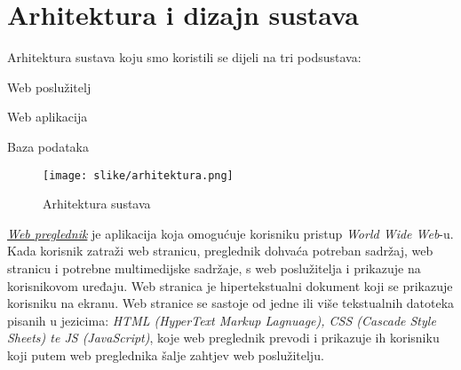 \chapter{Arhitektura i dizajn sustava}
		
%

	Arhitektura sustava koju smo koristili se dijeli na tri podsustava:
	
		\begin{packed_item}
			\item Web poslužitelj
			\item Web aplikacija
			\item Baza podataka
		\end{packed_item}

		\begin{figure}[H]
			\texttt{[image: slike/arhitektura.png]}
			\centering
			\caption{Arhitektura sustava}
			\label{fig:arhitektura}
		\end{figure}
		
		\textit{\underline{Web preglednik}} je aplikacija koja omogućuje korisniku pristup \textit{World Wide Web}-u. Kada korisnik zatraži web stranicu, preglednik dohvaća potreban sadržaj, web stranicu i potrebne multimedijske sadržaje, s web poslužitelja i prikazuje na korisnikovom uređaju. Web stranica je hipertekstualni dokument koji se prikazuje korisniku na ekranu. Web stranice se sastoje od jedne ili više tekstualnih datoteka pisanih u jezicima: \textit{HTML (HyperText Markup Lagnuage), CSS (Cascade Style Sheets) te JS (JavaScript)}, koje web preglednik prevodi i prikazuje ih korisniku koji putem web preglednika šalje zahtjev web poslužitelju.
		
